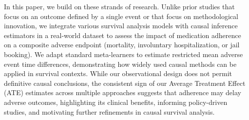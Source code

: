 In this paper, we build on these strands of research. Unlike prior studies that focus on an outcome defined by a single event or that focus on methodological innovation, we integrate various survival analysis models with causal inference estimators in a real-world dataset to assess the impact of medication adherence on a composite adverse endpoint (mortality, involuntary hospitalization, or jail booking).
We adapt standard meta-learners to estimate restricted mean adverse event time differences, demonstrating how widely used causal methods can be applied in survival contexts.
While our observational design does not permit definitive causal conclusions, the consistent sign of our Average Treatment Effect (ATE) estimates across multiple approaches suggests that adherence may delay adverse outcomes, highlighting its clinical benefits, informing policy-driven studies, and motivating further refinements in causal survival analysis.